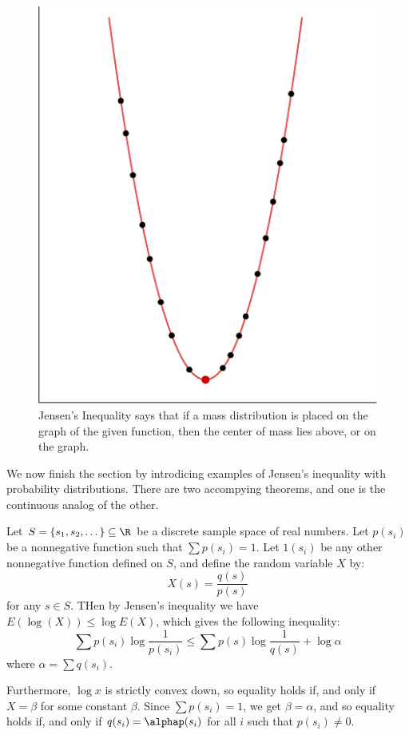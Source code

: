 \begin{figure}
    \centering
    \includegraphics[scale=0.2]{Figures/Chapter1/jensen_ineq.eps}
    \caption{Jensen's Inequality says that if a mass distribution is placed on
    the graph of the given function, then the center of mass lies above, or on
    the graph.
    }
    \label{fig_1.4}
\end{figure}

We now finish the section by introdicing examples of Jensen's inequality
with probability distributions. There are two accompying theorems, and one is
the continuous analog of the other.

\begin{example}
    Let $S=\{s_1, s_2, \dots\} \subseteq \R$ be a discrete sample
    space of real numbers. Let $p(s_i)$ be a nonnegative function such
    that $\sum{p(s_i)}=1$. Let $1(s_i)$ be any other nonnegative function
    defined on $S$, and define the random variable $X$ by:
    \begin{equation*}
        X(s)=\frac{q(s)}{p(s)}
    \end{equation*}
    for any $s \in S$. THen by Jensen's inequality we have $E(\log(X))
    \leq \log{E(X)}$, which gives the following inequality:
    \begin{equation*}
        \sum{p(s_i)\log{\frac{1}{p(s_i)}}} \leq
        \sum{p(s)\log{\frac{1}{q(s)}}}+\log{\alpha}
    \end{equation*}
    where $\alpha=\sum{q(s_i)}$.

    Furthermore, $\log{x}$ is strictly convex down, so equality holds
    if, and only if $X=\beta$ for some constant  $\beta$. Since
    $\sum{p(s_i)}=1$, we get $\beta=\alpha$, and so equality holds if,
    and only if  $q(s_i)=\alphap(s_i)$ for all $i$ such that  $p(s_i)
    \neq 0$.
\end{example}

